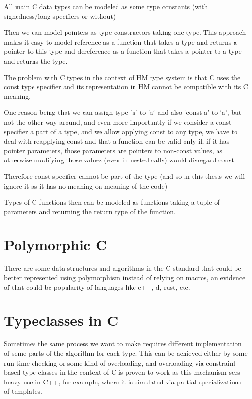 All main C data types can be modeled as some type constants (with signedness/long specifiers or without)

Then we can model pointers as type constructors taking one type.
This approach makes it easy to model reference as a function that takes a type and returns a pointer to this type
and dereference as a function that takes a pointer to a type and returns the type.

The problem with C types in the context of HM type system is that C uses the const type specifier and its representation
in HM cannot be compatible with its C meaning.

One reason being that we can assign type `a` to `a` and also `const a' to `a', but not the other way around, and even
more importantly if we consider a const specifier a part of a type, and we allow applying const to any type, we have
to deal with reapplying const and that a function can be valid only if, if it has pointer parameters, those parameters
are pointers to non-const values, as otherwise modifying those values (even in nested calls) would disregard const.

Therefore const specifier cannot be part of the type (and so in this thesis we will ignore it as it has no meaning on
meaning of the code).

Types of C functions then can be modeled as functions taking a tuple of parameters and returning the return type of the
function.


\section{Polymorphic C}

There are some data structures and algorithms in the C standard that could be better represented using polymorphism instead of relying on
macros, an evidence of that could be popularity of languages like c++, d, rust, etc.

\section{Typeclasses in C}

Sometimes the same process we want to make requires different implementation of some parts of the algorithm
for each type. This can be achieved either by some run-time checking or some kind of overloading, and overloading via
constraint-based type classes in the context of C is proven to work as this mechanism sees heavy use in C++, for example,
where it is simulated via partial specializations of templates.

